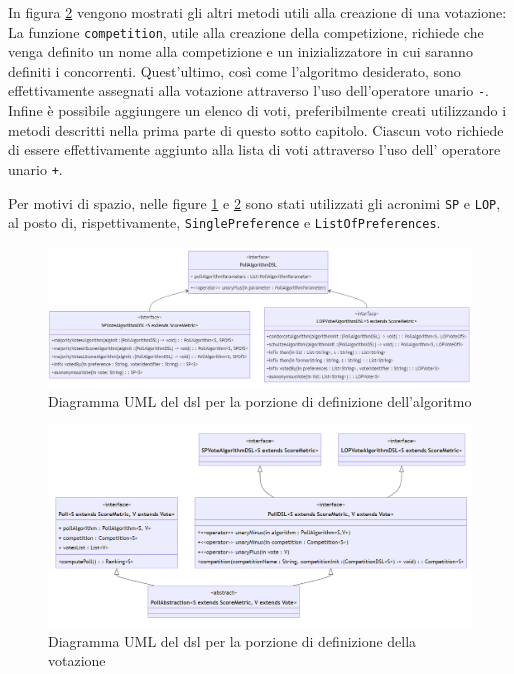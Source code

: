 \documentclass[12pt,a4paper,openright,twoside]{book}
\begin{document}
 In figura \ref{fig:pollDSL} vengono mostrati gli altri metodi utili alla creazione di una votazione:
 La funzione \texttt{competition}, utile alla creazione della competizione,
 richiede che venga definito un nome alla competizione e un inizializzatore in cui saranno definiti i concorrenti.
 Quest'ultimo, così come l'algoritmo desiderato, sono effettivamente assegnati alla votazione
 attraverso l'uso dell'operatore unario \texttt{-}.
 Infine è possibile aggiungere un elenco di voti, preferibilmente creati utilizzando i metodi descritti nella prima parte
 di questo sotto capitolo. Ciascun voto richiede di essere effettivamente aggiunto alla lista di voti attraverso
 l'uso dell' operatore unario \texttt{+}.

 Per motivi di spazio, nelle figure \ref{fig:pollAlgorithmDSL} e \ref{fig:pollDSL} sono stati utilizzati gli
 acronimi \texttt{SP} e \texttt{LOP}, al posto di, rispettivamente, \texttt{SinglePreference} e \texttt{ListOfPreferences}.

 \vfill
 \begin{center} 
 \begin{figure}[H]
     \centering
      \includegraphics[width=1.1\linewidth]{figures/pollAlgorithmDSL.png}
      \caption{Diagramma UML del \ac{dsl} per la porzione di definizione dell'algoritmo}
     \label{fig:pollAlgorithmDSL}
  \end{figure}
\end{center}
\vfill



\vfill
\begin{center}
 \begin{figure}[H]
     \centering
      \includegraphics[width=1.1\linewidth]{figures/pollDSL.png}
      \caption{Diagramma UML del \ac{dsl} per la porzione di definizione della votazione}
     \label{fig:pollDSL}
  \end{figure}
\end{center}
\vfill
  
\end{document}
